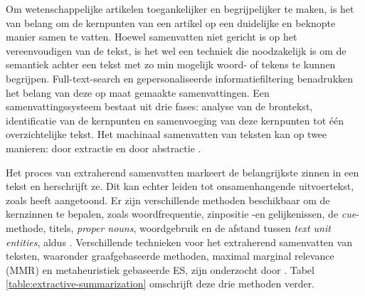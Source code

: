Om wetenschappelijke artikelen toegankelijker en begrijpelijker te maken, is het van belang om de kernpunten van een artikel op een duidelijke en beknopte manier samen te vatten. Hoewel samenvatten niet gericht is op het vereenvoudigen van de tekst, is het wel een techniek die noodzakelijk is om de semantiek achter een tekst met zo min mogelijk woord- of tekens te kunnen begrijpen. Full-text-search en gepersonaliseerde informatiefiltering benadrukken het belang van deze op maat gemaakte samenvattingen. Een samenvattingssysteem bestaat uit drie fases: analyse van de brontekst, identificatie van de kernpunten en samenvoeging van deze kernpunten tot één overzichtelijke tekst. Het machinaal samenvatten van teksten kan op twee manieren: door extractie en door abstractie \autocite{Hahn2000, Dubay2004}.

\medspace

Het proces van extraherend samenvatten markeert de belangrijkste zinnen in een tekst en herschrijft ze. Dit kan echter leiden tot onsamenhangende uitvoertekst, zoals \textcite{Khan2014} heeft aangetoond. Er zijn verschillende methoden beschikbaar om de kernzinnen te bepalen, zoals woordfrequentie, zinpositie -en gelijkenissen, de \textit{cue}-methode, titels, \textit{proper nouns}, woordgebruik en de afstand tussen \textit{text unit entities}, aldus \textcite{Khan2014}. Verschillende technieken voor het extraherend samenvatten van teksten, waaronder graafgebaseerde methoden, maximal marginal relevance (MMR) en metaheuristiek gebaseerde ES, zijn onderzocht door \textcite{Verma2020}. Tabel \ref{table:extractive-summarization} omschrijft deze drie methoden verder.

